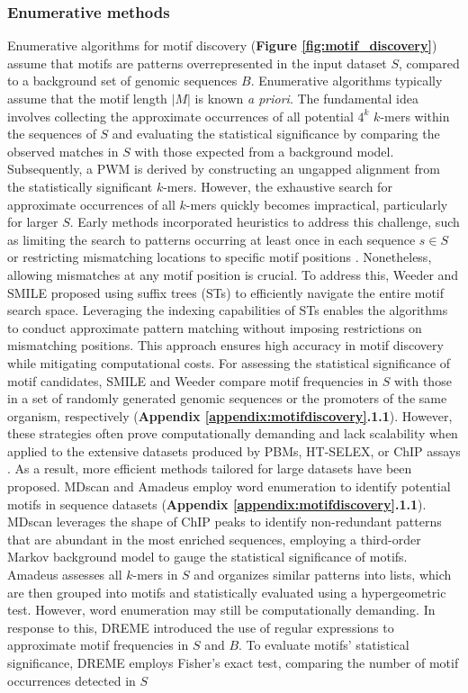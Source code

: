 \documentclass[a4paper, titlepage, openright]{book}
\begin{document}
\subsubsection{Enumerative methods}
Enumerative algorithms for motif discovery (\textbf{Figure \ref{fig:motif_discovery}}) assume that motifs are patterns overrepresented in the input dataset $S$, compared to a background set of genomic sequences
$B$⁠. Enumerative algorithms typically assume that the motif length $|M|$ is known \emph{a priori}. The fundamental idea involves collecting the approximate occurrences of all potential $4^{k}$ $k$-mers within the sequences of $S$ and evaluating the statistical significance by comparing the observed matches in $S$
with those expected from a background model. Subsequently, a PWM is derived by constructing an ungapped alignment from the statistically significant $k$-mers. However, the exhaustive search for approximate occurrences of all $k$-mers quickly becomes impractical, particularly for larger $S$. Early methods incorporated heuristics to address this challenge, such as limiting the search to patterns occurring at least once in each sequence $s \in S$ \citep{li1999finding} or restricting mismatching locations to specific motif positions \citep{califano2000splash}. Nonetheless, allowing mismatches at any motif position is crucial. To address this, Weeder \citep{pavesi2001algorithm,pavesi2004weeder} and SMILE \citep{marsan2000algorithms} proposed using suffix trees (STs) \citep{weiner1973linear} to efficiently navigate the entire motif search space. Leveraging the indexing capabilities of STs enables the algorithms to conduct approximate pattern matching without imposing restrictions on mismatching positions. This approach ensures high accuracy in motif discovery while mitigating computational costs. For assessing the statistical significance of motif candidates, SMILE and Weeder compare motif frequencies in $S$ with those in a set of randomly generated genomic sequences or the promoters of the same organism, respectively (\textbf{Appendix \ref{appendix:motifdiscovery}.1.1}). However, these strategies often prove computationally demanding and lack scalability when applied to the extensive datasets produced by PBMs, HT-SELEX, or ChIP assays \citep{liu2018algorithmic}. As a result, more efficient methods tailored for large datasets have been proposed. MDscan \citep{liu2002algorithm} and Amadeus \citep{linhart2008transcription} employ word enumeration to identify potential motifs in sequence datasets (\textbf{Appendix \ref{appendix:motifdiscovery}.1.1}). MDscan leverages the shape of ChIP peaks to identify non-redundant patterns that are abundant in the most enriched sequences, employing a third-order Markov background model to gauge the statistical significance of motifs. Amadeus assesses all $k$-mers in $S$ and organizes similar patterns into lists, which are then grouped into motifs and statistically evaluated using a hypergeometric test. However, word enumeration may still be computationally demanding. In response to this, DREME \citep{bailey2011dreme} introduced the use of regular expressions to approximate motif frequencies in $S$ and $B$⁠. To evaluate motifs' statistical significance, DREME employs Fisher’s exact test, comparing the number of motif occurrences detected in $S$
\end{document}

